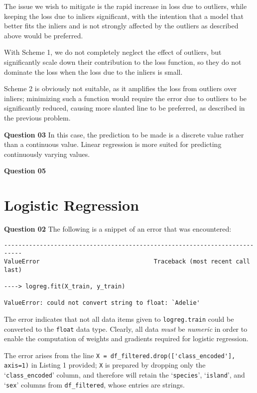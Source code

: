 \documentclass{article}[a4paper]
\begin{document}
	The issue we wish to mitigate is the rapid increase in loss due to outliers, while keeping the loss due to inliers significant, with the intention that a model that better fits the inliers and is not strongly affected by the outliers as described above would be preferred.

	With Scheme 1, we do not completely neglect the effect of outliers, but significantly scale down their contribution to the loss function, so they do not dominate the loss when the loss due to the inliers is small.

	Scheme 2 is obviously not suitable, as it amplifies the loss from outliers over inliers; minimizing such a function would require the error due to outliers to be significantly reduced, causing more slanted line to be preferred, as described in the previous problem.
	\medskip
	
	\textbf{Question 03} In this case, the prediction to be made is a discrete value rather than a continuous value. Linear regression is more suited for predicting continuously varying values.
	\medskip

	\textbf{Question 05}
	\medskip

	\section{Logistic Regression}

	\textbf{Question 02} The following is a snippet of an error that was encountered:
	\begin{verbatim}
---------------------------------------------------------------------------
ValueError                                Traceback (most recent call last)

----> logreg.fit(X_train, y_train)

ValueError: could not convert string to float: `Adelie'\end{verbatim}

	The error indicates that not all data items given to \texttt{logreg.train} could be converted to the \texttt{float} data type. Clearly, all data \textit{must} be \textit{numeric} in order to enable the computation of weights and gradients required for logistic regression.

	The error arises from the line \lstinline|X = df_filtered.drop(['class_encoded'], axis=1)| in Listing 1 provided; \texttt{X} is prepared by dropping only the `\texttt{class\_encoded}' column, and therefore will retain the `\texttt{species}', `\texttt{island}', and `\texttt{sex}' columns from \texttt{df\_filtered}, whose entries are strings.
\end{document}
